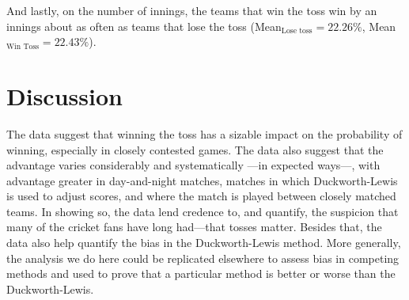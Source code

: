 \documentclass[12pt]{article}
\begin{document}
And lastly, on the number of innings, the teams that win the toss win by an innings about as often as teams that lose the toss (Mean$_{\text{Lose toss}} = 22.26\%$, Mean$_{\text{Win Toss}} = 22.43\%$).

\section*{Discussion}

The data suggest that winning the toss has a sizable impact on the probability of winning, especially in closely contested games. The data also suggest that the advantage varies considerably and systematically ---in expected ways---, with advantage greater in day-and-night matches, matches in which Duckworth-Lewis is used to adjust scores, and where the match is played between closely matched teams. In showing so, the data lend credence to, and quantify, the suspicion that many of the cricket fans have long had---that tosses matter. Besides that, the data also help quantify the bias in the Duckworth-Lewis method. More generally, the analysis we do here could be replicated elsewhere to assess bias in competing methods and used to prove that a particular method is better or worse than the Duckworth-Lewis. 

\clearpage


\end{document}
